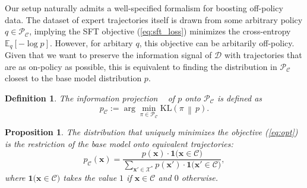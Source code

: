 \documentclass{article}
\newtheorem{proposition}{Proposition}
\newtheorem{definition}{Definition}
\begin{document}
Our setup naturally admits a well-specified formalism for boosting off-policy data. The dataset of expert trajectories itself is drawn from some arbitrary policy $q \in \mathcal{P}_{\mathcal{C}}$, implying the SFT objective (\ref{eq:sft_loss}) minimizes the cross-entropy $\mathbb{E}_q[- \log p]$. However, for arbitary $q$, this objective can be arbitarily off-policy.  Given that we want to preserve the information signal of $\mathcal{D}$  with trajectories that are as on-policy as possible, this is equivalent to finding the distribution in $\mathcal{P}_{\mathcal{C}}$ closest to the base model distribution $p$. 

\begin{definition}
{\rm The \textit{information projection} ~\citep{csiszar1975divergence} of $p$ onto
$\mathcal{P}_{\mathcal{C}}$ is defined as
\begin{equation}\label{eq:opt}
    p_{\mathcal{C}}
    :=
    \arg\min_{\pi \in \mathcal{P}_{\mathcal{C}}}
    \mathrm{KL}\!\left(
        \pi
        \,\middle\|\,
        p
    \right).
\end{equation}}
\end{definition}

\begin{proposition}
The distribution that uniquely minimizes the objective (\ref{eq:opt})
is the restriction of the base model onto equivalent trajectories:
\[
    p_{\mathcal{C}}(\mathbf{x})
    =
    \frac{
        p(\mathbf{x}) \cdot 
        \mathbf{1}\bigl(\mathbf{x} \in \mathcal{C}\bigr)
    }{
        \sum_{\mathbf{x}' \in \mathcal{X}^*}
    p(\mathbf{x}') \cdot 
    \mathbf{1}\bigl(\mathbf{x}' \in \mathcal{C}\bigr)
    },
\]
where $\mathbf{1}\bigl(\mathbf{x} \in \mathcal{C}\bigr)$  takes the value $1$ if $\mathbf{x} \in \mathcal{C}$ and $0$ otherwise.
\end{proposition}
\end{document}
